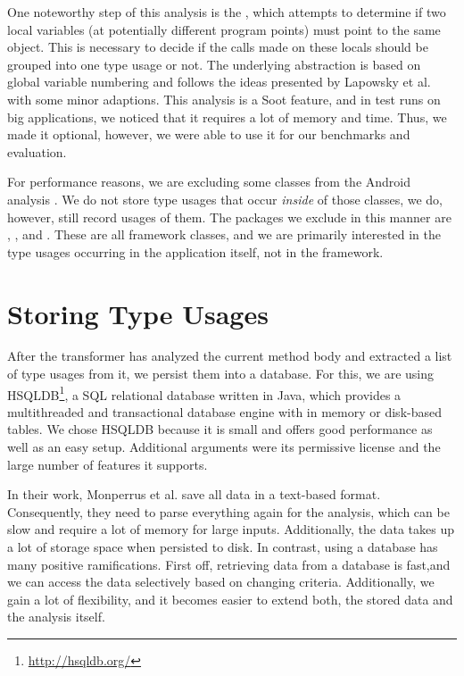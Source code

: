 One noteworthy step of this analysis is the , which attempts to determine if two local variables (at potentially different program points) must point to the same object.
This is necessary to decide if the calls made on these locals should be grouped into one type usage or not.
The underlying abstraction is based on global variable numbering and follows the ideas presented by Lapowsky et al. \cite{lapkowski1998extended} with some minor adaptions.
This analysis is a Soot feature, and in test runs on big applications, we noticed that it requires a lot of memory and time.
Thus, we made it optional, however, we were able to use it for our benchmarks and evaluation.

For performance reasons, we are excluding some classes from the Android analysis .
We do not store type usages that occur \emph{inside} of those classes, we do, however, still record usages of them.
The packages we exclude in this manner are , ,  and  .
These are all framework classes, and we are primarily interested in the type usages occurring in the application itself, not in the framework.

\section{Storing Type Usages}

After the transformer has analyzed the current method body and extracted a list of type usages from it, we persist them into a database.
For this, we are using HSQLDB\footnote{\url{http://hsqldb.org/}}, a SQL relational database written in Java, which provides a multithreaded and transactional database engine with in memory or disk-based tables.
We chose HSQLDB because it is small and offers good performance as well as an easy setup.
Additional arguments were its permissive license and the large number of features it supports.

In their work, Monperrus et al. save all data in a text-based format.
Consequently, they need to parse everything again for the analysis, which can be slow and require a lot of memory for large inputs.
Additionally, the data takes up a lot of storage space when persisted to disk.
In contrast, using a database has many positive ramifications.
First off, retrieving data from a database is fast,and we can access the data selectively based on changing criteria.
Additionally, we gain a lot of flexibility, and it becomes easier to extend both, the stored data and the analysis itself.

